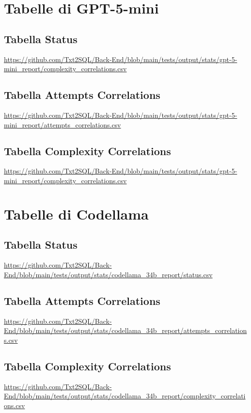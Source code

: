 \section{Tabelle di GPT-5-mini}

\subsection{Tabella Status}
\label{tab:status_gpt5mini}
\url{https://github.com/Txt2SQL/Back-End/blob/main/tests/output/stats/gpt-5-mini_report/complexity_correlations.csv}

\subsection{Tabella Attempts Correlations}
\label{tab:attempts_gpt5mini}
\url{https://github.com/Txt2SQL/Back-End/blob/main/tests/output/stats/gpt-5-mini_report/attempts_correlations.csv}

\subsection{Tabella Complexity Correlations}
\label{tab:complexity_gpt5mini}
\url{https://github.com/Txt2SQL/Back-End/blob/main/tests/output/stats/gpt-5-mini_report/complexity_correlations.csv}


\section{Tabelle di Codellama}

\subsection{Tabella Status}
\label{tab:status_codellama}
\url{https://github.com/Txt2SQL/Back-End/blob/main/tests/output/stats/codellama_34b_report/status.csv}

\subsection{Tabella Attempts Correlations}
\label{tab:attempts_codellama}
\url{https://github.com/Txt2SQL/Back-End/blob/main/tests/output/stats/codellama_34b_report/attempts_correlations.csv}

\subsection{Tabella Complexity Correlations}
\label{tab:complexity_codellama}
\url{https://github.com/Txt2SQL/Back-End/blob/main/tests/output/stats/codellama_34b_report/complexity_correlations.csv}


